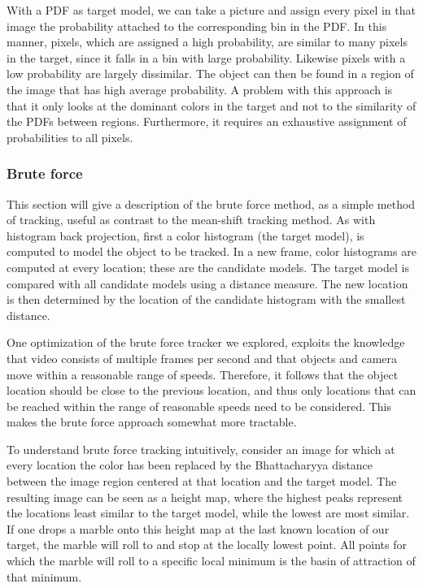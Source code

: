 \documentclass[a4paper,11pt]{article}
\begin{document}
With a PDF as target model, we can take a picture and assign every pixel in that image the probability attached to the corresponding bin in the PDF. In this manner, pixels, which are assigned a high probability, are similar to many pixels in the target, since it falls in a bin with large probability. Likewise pixels with a low probability are largely dissimilar. The object can then be found in a region of the image that has high average probability. A problem with this approach is that it only looks at the dominant colors in the target and not to the similarity of the PDFs between regions. Furthermore, it requires an exhaustive assignment of probabilities to all pixels.

\subsubsection{Brute force}
This section will give a description of the brute force method, as a simple method of tracking, useful as contrast to the mean-shift tracking method. As with histogram back projection, first a color histogram (the target model), is computed to model the object to be tracked. In a new frame, color histograms are computed at every location; these are the candidate models. The target model is compared with all candidate models using a distance measure. The new location is then determined by the location of the candidate histogram with the smallest distance.

One optimization of the brute force tracker we explored, exploits the knowledge that video consists of multiple frames per second and that objects and camera move within a reasonable range of speeds. Therefore, it follows that the object location should be close to the previous location, and thus only locations that can be reached within the range of reasonable speeds need to be considered. This makes the brute force approach somewhat more tractable. 

To understand brute force tracking intuitively, consider an image for which at every location the color has been replaced by the Bhattacharyya distance between the image region centered at that location and the target model. The resulting image can be seen as a height map, where the highest peaks represent the locations least similar to the target model, while the lowest are most similar. If one drops a marble onto this height map at the last known location of our target, the marble will roll to and stop at the locally lowest point. All points for which the marble will roll to a specific local minimum is the basin of attraction of that minimum. 
\end{document}
